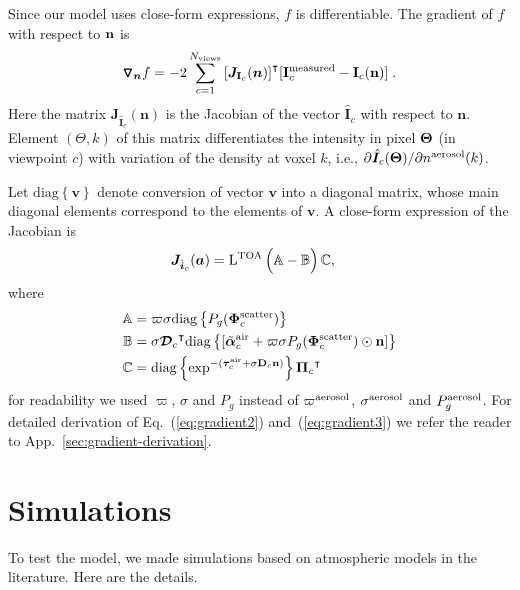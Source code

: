 \documentclass[10pt,twocolumn,letterpaper]{article}
\newcommand{\OpDistance}{\bm{\mathcal{D}}}
\newcommand{\OpDiag}[1]{\mathrm{diag}\left\{#1\right\}}
\newcommand{\Grad}[1]{\bm{\triangledown_{#1}}}
\newcommand{\vect}[1]{\bm{#1}}
\newcommand{\mat}[1]{\bm{#1}}
\newcommand{\transpose}[1]{{#1}^\intercal}
\begin{document}
Since our model uses close-form expressions, $f$ is differentiable. The gradient of $f$ with respect to ${\bf n}$ is
\begin{align}
  \Grad{\vect{n}} f = -2\sum_{c=1}^{N_{\rm views}}
  \transpose{\left[\mat{J}_{{\bf I}_c}(\vect{n})\right]}
  [{\bf I}^{\rm measured}_c - {\bf I}_c({\bf n})]
  \;.
  \label{eq:gradient1}
\end{align}
Here the matrix $\mat{J}_{\hat{\vect{I}}_c}(\vect{n})$ is the Jacobian  of
the vector $\hat{\vect{I}}_c$ with respect to $\vect{n}$. Element $(\Theta,k)$ of this matrix
differentiates the intensity in pixel ${\bf \Theta}$ (in viewpoint $c$) with variation of the density at voxel $k$, i.e.,
  $\partial \hat{\vect{I}}_{c}({\bf \Theta})/\partial{n^{\rm aerosol}(k)}$.

Let $\OpDiag{\vect{v}}$ denote conversion of vector $\vect{v}$ into a diagonal matrix, 
whose main diagonal elements correspond to the elements of $\vect{v}$. 
A close-form expression of the Jacobian is
\begin{align}
  \mat{J}_{\hat{\vect{i}}_c}(\vect{a}) &= \mathrm{L}^{\rm TOA}\,
  \Big(\mathbb{A} - \mathbb{B} \Big) \, \mathbb{C} ,
  \label{eq:gradient2}
\end{align}
where
\begin{align}
  \label{eq:gradient3}
  \mathbb{A} &= \varpi\sigma\OpDiag{ P_g(\vect{\Phi}^{\rm scatter}_c)} \nonumber \\
  \mathbb{B} &= {\sigma}\transpose{\OpDistance_c} \OpDiag{[\tilde{\vect{\alpha}}^{\rm air}_c + \varpi\sigma P_g(\vect{\Phi}^{\rm scatter}_c) \odot{\bf n} ]} \nonumber \\
  \mathbb{C} &= \OpDiag{\exp^{-(\vect{\tau}_c^{\rm air} + {\sigma} {\bf D}_c {\bf n})}} \transpose{{\vect{\Pi}}_c}
\end{align}
for readability we used $\varpi$, $\sigma$ and $P_g$ instead of
$\varpi^{\rm aerosol}$, $\sigma^{\rm aerosol}$ and $P^{\rm aerosol}_g$.
For detailed derivation of Eq.~(\ref{eq:gradient2}) and~(\ref{eq:gradient3})
we refer the reader to App.~\ref{sec:gradient-derivation}.

\section{Simulations}
\label{sec:simul}

To test the model, we made simulations based on atmospheric models in the literature. Here are the details.\\
\end{document}
